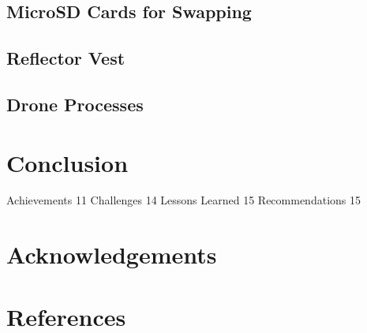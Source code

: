 \documentclass[a4paper,12pt,twoside]{article}
\begin{document}
\begin{multicols}{2}
\lipsum[0-5]
\end{multicols}

\subsection{MicroSD Cards for Swapping}

\begin{multicols}{2}
\lipsum[0-5]
\end{multicols}

\subsection{Reflector Vest}

\begin{multicols}{2}
\lipsum[0-5]
\end{multicols}

\subsection{Drone Processes}

\begin{multicols}{2}
\lipsum[0-5]
\end{multicols}

\section{Conclusion}

\begin{multicols}{2}
\lipsum[0-5]
\end{multicols}

Achievements	11
Challenges	14
Lessons Learned	15
Recommendations	15

\section{Acknowledgements}

\begin{multicols}{2}
\lipsum[0-5]
\end{multicols}

\section{References}

\begin{multicols}{2}
\lipsum[0-5]
\end{multicols}
\end{document}
